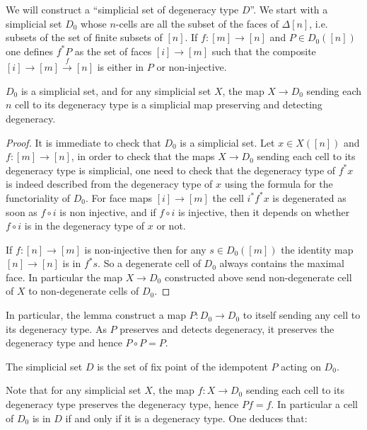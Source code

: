 \documentclass[reqno,10pt,a4paper,oneside,draft]{amsart}
\begin{document}
We will construct a ``simplicial set of degeneracy type $D$''. We start with a simplicial set $D_0$ whose $n$-cells are all the subset of the faces of $\Delta[n]$, i.e. subsets of the set of finite subsets of $[n]$. If $f : [m] \rightarrow [n]$ and $P \in D_0([n])$ one defines $f^* P$ as the set of faces  $[i] \rightarrow [m]$ such that the composite $[i] \rightarrow [m] \overset{f}{\rightarrow} [n]$ is either in $P$ or non-injective.

\begin{lemma}
$D_0$ is a simplicial set, and for any simplicial set $X$, the map $X \rightarrow D_0$ sending each $n$ cell to its degeneracy type is a simplicial map preserving and detecting degeneracy.
\end{lemma}

\begin{proof}
It is immediate to check that $D_0$ is a simplicial set. Let $x \in X([n])$ and $f:[m] \rightarrow [n]$, in order to check that the maps $X \rightarrow D_0$ sending each cell to its degeneracy type is simplicial, one need to check that the degeneracy type of $f^* x$ is indeed described from the degeneracy type of $x$ using the formula for the functoriality of $D_0$. For face maps $[i] \rightarrow [m]$ the cell $i^* f^* x$ is degenerated as soon as $f \circ i$ is non injective, and if $f\circ i$ is injective, then it depends on whether $f \circ i$ is in the degeneracy type of $x$ or not.

If $f:[n] \rightarrow [m]$ is non-injective then for any $s \in D_0([m])$ the identity map $[n] \rightarrow [n]$ is in $f^* s$. So a degenerate cell of $D_0$ always contains the maximal face. In particular the map $X \rightarrow D_0$ constructed above send non-degenerate cell of $X$ to non-degenerate cells of $D_0$.

\end{proof}

In particular, the lemma construct a map $P:D_0 \rightarrow D_0$ to itself sending any cell to its degeneracy type. As $P$ preserves and detects degeneracy, it preserves the degeneracy type and hence $P \circ P =P$.

\begin{definition}
The simplicial set $D$ is the set of fix point of the idempotent $P$ acting on $D_0$.
\end{definition}

Note that for any simplicial set $X$, the map $f:X \rightarrow D_0$ sending each cell to its degeneracy type preserves the degeneracy type, hence $P f = f$. In particular a cell of $D_0$ is in $D$ if and only if it is a degeneracy type. One deduces that:
\end{document}
